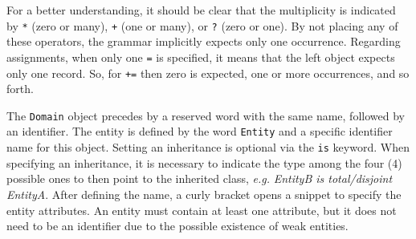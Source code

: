 For a better understanding, it should be clear that the multiplicity is indicated by \texttt{*} (zero or many), \texttt{+} (one or many), or \texttt{?} (zero or one).
By not placing any of these operators, the grammar implicitly expects only one occurrence.
Regarding assignments, when only one \texttt{=} is specified, it means that the left object expects only one record.
So, for \texttt{+=} then zero is expected, one or more occurrences, and so forth.

The \texttt{Domain} object precedes by a reserved word with the same name, followed by an identifier.
The entity is defined by the word \texttt{Entity} and a specific identifier name for this object.
Setting an inheritance is optional via the \texttt{is} keyword.
When specifying an inheritance, it is necessary to indicate the type among the four (4) possible ones to then point to the inherited class, \textit{e.g.} \textit{EntityB is total/disjoint EntityA}.
After defining the name, a curly bracket opens a snippet to specify the entity attributes. 
An entity must contain at least one attribute, but it does not need to be an identifier due to the possible existence of weak entities.

